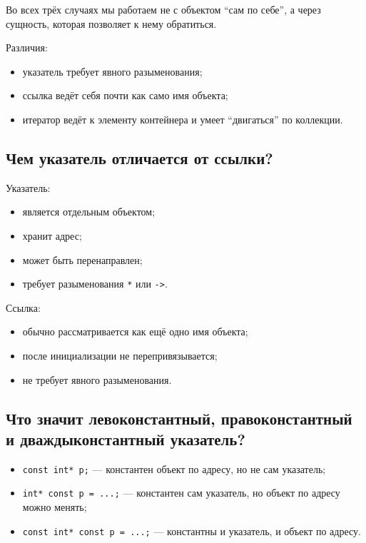 Во всех трёх случаях мы работаем не с объектом ``сам по себе'', а через сущность, которая позволяет к нему обратиться.

Различия:
\begin{itemize}
    \item указатель требует явного разыменования;
    \item ссылка ведёт себя почти как само имя объекта;
    \item итератор ведёт к элементу контейнера и умеет ``двигаться'' по коллекции.
\end{itemize}


\subsection{Чем указатель отличается от ссылки?}

Указатель:
\begin{itemize}
    \item является отдельным объектом;
    \item хранит адрес;
    \item может быть перенаправлен;
    \item требует разыменования \texttt{*} или \texttt{->}.
\end{itemize}

Ссылка:
\begin{itemize}
    \item обычно рассматривается как ещё одно имя объекта;
    \item после инициализации не перепривязывается;
    \item не требует явного разыменования.
\end{itemize}


\subsection{Что значит левоконстантный, правоконстантный и дваждыконстантный указатель?}

\begin{itemize}
    \item \texttt{const int* p;} --- константен объект по адресу, но не сам указатель;
    \item \texttt{int* const p = ...;} --- константен сам указатель, но объект по адресу можно менять;
    \item \texttt{const int* const p = ...;} --- константны и указатель, и объект по адресу.
\end{itemize}

